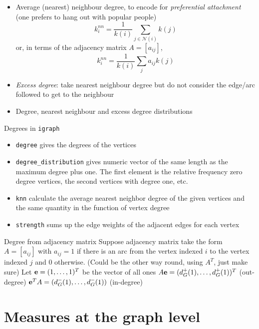\documentclass[aspectratio=43]{beamer}
\begin{document}
\begin{frame}
	\begin{itemize}
		\item Average (nearest) neighbour degree, to encode for \emph{preferential attachment} (one prefers to hang out with popular people)
		\[
			k_i^{nn} = \frac{1}{k(i)}\sum_{j\in\mathcal{N}(i)}k(j)
		\]
		or, in terms of the adjacency matrix $A=[a_{ij}]$,
		\[
			k_i^{nn} = \frac{1}{k(i)}\sum_{j}a_{ij}k(j)
		\]
		\item \emph{Excess degree}: take nearest neighbour degree but do not consider the edge/arc followed to get to the neighbour
		\item Degree, nearest neighbour and excess degree distributions
	\end{itemize}
\end{frame}


\begin{frame}{Degrees in {\tt igraph}}
	\begin{itemize}
		\item {\tt degree} gives the degrees of the vertices
		\item {\tt degree\_distribution} gives numeric vector of the same length as the maximum degree plus one. The first element is the relative frequency zero degree vertices, the second vertices with degree one, etc.
		\item {\tt knn} calculate the average nearest neighbor degree of the given vertices and the same quantity in the function of vertex degree
		\item {\tt strength} sums up the edge weights of the adjacent edges for each vertex
	\end{itemize}
\end{frame}

\begin{frame}{Degree from adjacency matrix}
	Suppose adjacency matrix take the form $A=[a_{ij}]$ with $a_{ij}=1$ if there is an arc from the vertex indexed $i$ to the vertex indexed $j$ and 0 otherwise. (Could be the other way round, using $A^T$, just make sure)
	\vfill
	Let $\mathbf{e}=(1,\ldots,1)^T$ be the vector of all ones 
	\vfill
	$A\mathbf{e}=(d_G^+(1),\ldots,d_G^+(1))^T$ (out-degree)
	\vfill
	$\mathbf{e}^TA=(d_G^-(1),\ldots,d_G^-(1))$ (in-degree)
\end{frame}


\section{Measures at the graph level}
\end{document}
